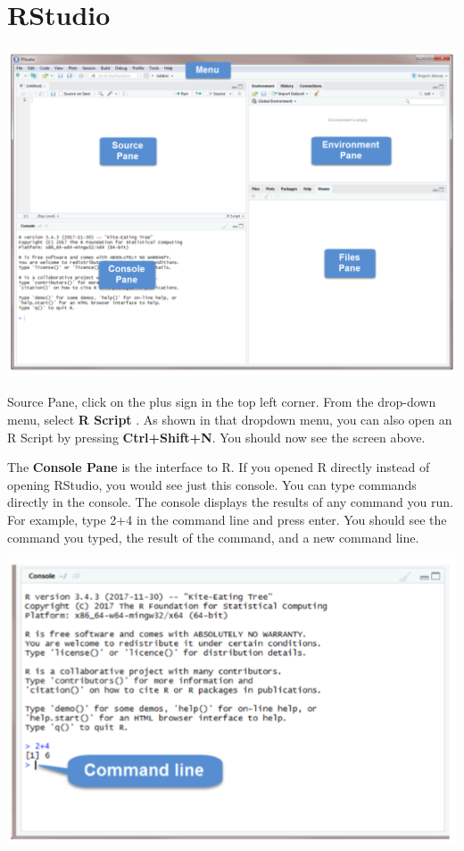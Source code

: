 \documentclass[
]{book}
\theoremstyle{definition}
\theoremstyle{definition}
\theoremstyle{definition}
\theoremstyle{definition}
\theoremstyle{remark}
\begin{document}
\hypertarget{rstudio}{%
\section{RStudio}\label{rstudio}}

\includegraphics[width=15.15in]{png/Rstudio}

Source Pane, click on the plus sign in the top left corner. From the drop-down menu, select \textbf{R Script} . As shown in that dropdown menu, you can also open an R Script by pressing \textbf{Ctrl+Shift+N}. You should now see the screen above.

The \textbf{Console Pane} is the interface to R. If you opened R directly instead of opening RStudio, you would see just this console. You can type commands directly in the console. The console displays the results of any command you run. For example, type 2+4 in the command line and press enter. You should see the command you typed, the result of the command, and a new command line.

\includegraphics[width=8.24in]{png/Rstudio2}
\end{document}

